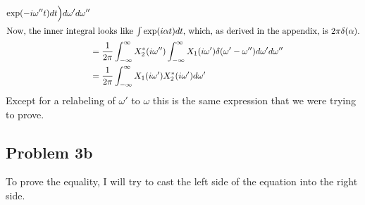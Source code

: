 \begin{homeworkProblem}
\begin{align*}
      \exp(-i \omega'' t)dt\Bigr) d\omega' d\omega'' \\
      \intertext{Now, the inner integral looks like $ \int \exp(i \alpha t) dt $,
      which, as derived in the appendix, is $ 2\pi\delta(\alpha) $.}
      &= \frac{1}{2\pi}
      \int_{-\infty}^{\infty}X_{2}^{*}(i\omega'')
      \int_{-\infty}^{\infty}X_{1}(i\omega')
      \delta(\omega'-\omega'') d\omega' d\omega'' \\
      &= \frac{1}{2\pi}
      \int_{-\infty}^{\infty} X_{1}(i\omega') X_{2}^{*}(i\omega') d\omega'
   \end{align*}
   Except for a relabeling of $ \omega' $ to $ \omega $ this is the same
   expression that we were trying to prove.

   \subsection{Problem 3b}
   To prove the equality, I will try to cast the left side of the equation
   into the right side.


\end{homeworkProblem}
